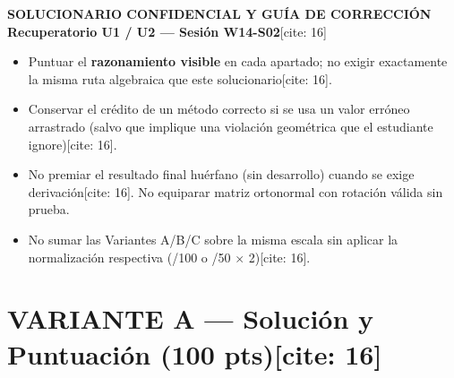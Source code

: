 \documentclass[11pt, a4paper]{article}
\begin{document}
\begin{center}
    \Large\textbf{\textcolor{red!80!black}{SOLUCIONARIO CONFIDENCIAL Y GUÍA DE CORRECCIÓN}}\\[0.15cm]
    \normalsize \textbf{Recuperatorio U1 / U2 — Sesión W14-S02}[cite: 16]
\end{center}

\begin{tcolorbox}[colback=yellow!10, colframe=black, title=\textbf{Reglas de Parcialidad y Equidad} {[cite: 16]}, left=2mm, right=2mm, top=1mm, bottom=1mm]
    \scriptsize\raggedright
    \begin{itemize}\setlength{\itemsep}{1pt}
        \item Puntuar el \textbf{razonamiento visible} en cada apartado; no exigir exactamente la misma ruta algebraica que este solucionario[cite: 16].
        \item Conservar el crédito de un método correcto si se usa un valor erróneo arrastrado (salvo que implique una violación geométrica que el estudiante ignore)[cite: 16].
        \item No premiar el resultado final huérfano (sin desarrollo) cuando se exige derivación[cite: 16]. No equiparar matriz ortonormal con rotación válida sin prueba.
        \item No sumar las Variantes A/B/C sobre la misma escala sin aplicar la normalización respectiva (/100 o /50 $\times$ 2)[cite: 16].
    \end{itemize}
\end{tcolorbox}

\section*{VARIANTE A — Solución y Puntuación (100 pts)[cite: 16]}
\end{document}
